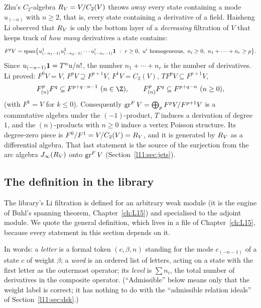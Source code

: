Zhu's $C_2$-algebra $R_V = V/C_2(V)$ throws away every state containing a mode $u_{(-n)}$ with
$n\ge2$, that is, every state containing a derivative of a field. Haisheng Li observed that $R_V$
is only the bottom layer of a \emph{decreasing} filtration of $V$ that keeps track of \emph{how many}
derivatives a state contains:
\begin{equation}\label{l11:eq:lidef}
F^pV = \operatorname{span}\bigl\{u^1_{(-n_1-1)}u^2_{(-n_2-1)}\cdots u^r_{(-n_r-1)}\mathbf{1}\ :\
r\ge0,\ u^i\text{ homogeneous},\ n_i\ge0,\ n_1+\cdots+n_r\ge p\bigr\}.
\end{equation}
Since $u_{(-n-1)}\mathbf{1} = T^nu/n!$, the number $n_1+\cdots+n_r$ is the number of derivatives. Li
proved: $F^0V = V$, $F^pV\supseteq F^{p+1}V$, $F^1V = C_2(V)$, $T F^pV\subseteq F^{p+1}V$,
\begin{equation}\label{l11:eq:limult}
F^p_{(n)}F^q\subseteq F^{p+q-n-1}\ (n\in\Z),\qquad F^p_{(n)}F^q\subseteq F^{p+q-n}\ (n\ge0),
\end{equation}
(with $F^{k} = V$ for $k\le0$). Consequently $\operatorname{gr}^FV = \bigoplus_pF^pV/F^{p+1}V$ is a commutative
algebra under the $(-1)$-product, $T$ induces a derivation of degree $1$, and the $(n)$-products with
$n\ge0$ induce a vertex Poisson structure. Its degree-zero piece is $F^0/F^1 = V/C_2(V) = R_V$, and
it is generated by $R_V$ as a differential algebra. That last statement is the source of the
surjection from the arc algebra $J_\infty(R_V)$ onto $\operatorname{gr}^FV$
(Section~\ref{l11:sec:jets}).

\subsection{The definition in the library}

The library's Li filtration is defined for an arbitrary weak module (it is the engine of Buhl's spanning
theorem, Chapter~\ref{ch:L15}) and specialised to the adjoint module. We quote the general definition,
which lives in a file of Chapter~\ref{ch:L15}, because every statement in this section depends on it.

In words: a \emph{letter} is a formal token $(c,\beta,n)$ standing for the mode $c_{(-n-1)}$ of a state $c$ of weight $\beta$; a
\emph{word} is an ordered list of letters, acting on a state with the first letter as the outermost operator; its \emph{level} is
$\sum n_i$, the total number of derivatives in the composite operator. (``Admissible'' below means only that the weight label is
correct; it has nothing to do with the ``admissible relation ideals'' of Section~\ref{l11:sec:dsk}.)

